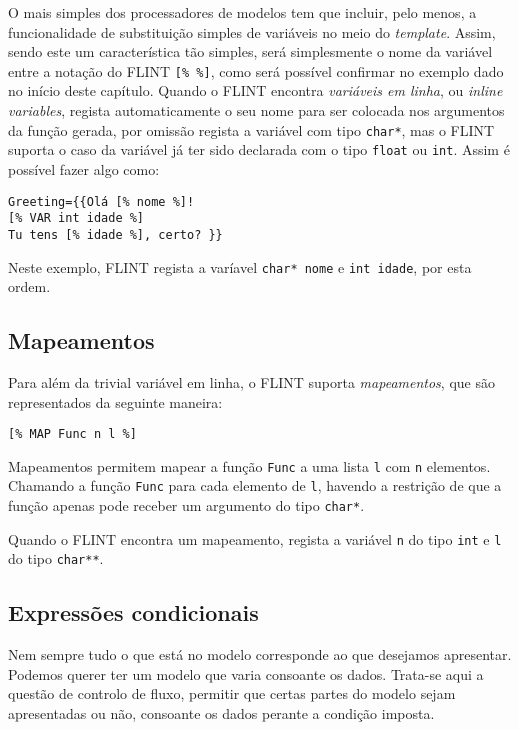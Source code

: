 O mais simples dos processadores de modelos tem que incluir, pelo menos, a funcionalidade de substituição simples de variáveis no meio do \textit{template}. Assim, sendo este um característica tão simples, será simplesmente o nome da variável entre a notação do FLINT \texttt{[\% \%]}, como será possível confirmar no exemplo dado no início deste capítulo. Quando o FLINT encontra \emph{variáveis em linha}, ou \textit{inline variables}, regista automaticamente o seu nome para ser colocada nos argumentos da função gerada, por omissão regista a variável com tipo \texttt{char*}, mas o FLINT suporta o caso da variável já ter sido declarada com o tipo \texttt{float} ou \texttt{int}. Assim é possível fazer algo como:

\begin{lstlisting}
Greeting={{Olá [% nome %]!
[% VAR int idade %]
Tu tens [% idade %], certo? }}
\end{lstlisting}
Neste exemplo, FLINT regista a varíavel \texttt{char* nome} e \texttt{int idade}, por esta ordem.

\subsection{Mapeamentos}

Para além da trivial variável em linha, o FLINT suporta \emph{mapeamentos}, que são representados da seguinte maneira:
\begin{lstlisting}
[% MAP Func n l %]
\end{lstlisting}
Mapeamentos permitem mapear a função \texttt{Func} a uma lista \texttt{l} com \texttt{n} elementos. Chamando a função \texttt{Func} para cada elemento de \texttt{l}, havendo a restrição de que a função apenas pode receber um argumento do tipo \texttt{char*}.

Quando o FLINT encontra um mapeamento, regista a variável \texttt{n} do tipo \texttt{int} e \texttt{l} do tipo \texttt{char**}.

\subsection{Expressões condicionais}


Nem sempre tudo o que está no modelo corresponde ao que desejamos apresentar. Podemos querer ter um modelo que varia consoante os dados. Trata-se aqui a questão de controlo de fluxo, permitir que certas partes do modelo sejam apresentadas ou não, consoante os dados perante a condição imposta.

